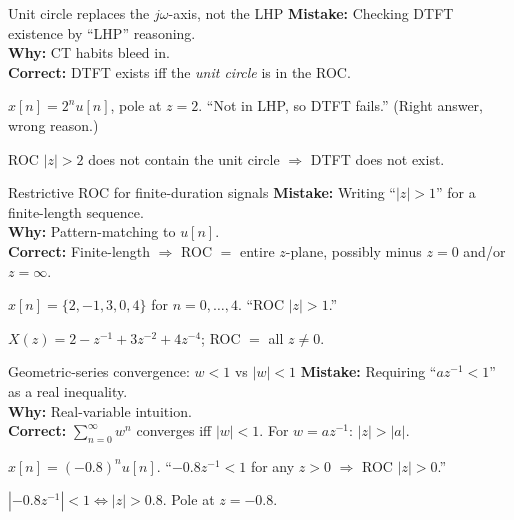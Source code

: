 \documentclass[11pt]{article}
\begin{document}
\begin{pitfallbox}{Unit circle replaces the $j\omega$-axis, not the LHP}
\textbf{Mistake:} Checking DTFT existence by ``LHP'' reasoning.\\
\textbf{Why:} CT habits bleed in.\\
\textbf{Correct:} DTFT exists iff the \emph{unit circle} is in the ROC.
\begin{wrongbox}
$x[n] = 2^n u[n]$, pole at $z=2$. ``Not in LHP, so DTFT fails.'' (Right answer, wrong reason.)
\end{wrongbox}
\begin{rightbox}
ROC $|z|>2$ does not contain the unit circle $\Rightarrow$ DTFT does not exist.
\end{rightbox}
\end{pitfallbox}

\begin{pitfallbox}{Restrictive ROC for finite-duration signals}
\textbf{Mistake:} Writing ``$|z|>1$'' for a finite-length sequence.\\
\textbf{Why:} Pattern-matching to $u[n]$.\\
\textbf{Correct:} Finite-length $\Rightarrow$ ROC $=$ entire $z$-plane, possibly minus $z=0$ and/or $z=\infty$.
\begin{wrongbox}
$x[n] = \{2, -1, 3, 0, 4\}$ for $n=0,\ldots,4$. ``ROC $|z|>1$.''
\end{wrongbox}
\begin{rightbox}
$X(z) = 2 - z^{-1} + 3 z^{-2} + 4 z^{-4}$; ROC $=$ all $z\ne 0$.
\end{rightbox}
\end{pitfallbox}

\begin{pitfallbox}{Geometric-series convergence: $w<1$ vs $|w|<1$}
\textbf{Mistake:} Requiring ``$az^{-1} < 1$'' as a real inequality.\\
\textbf{Why:} Real-variable intuition.\\
\textbf{Correct:} $\sum_{n=0}^\infty w^n$ converges iff $|w|<1$. For $w = az^{-1}$: $|z|>|a|$.
\begin{wrongbox}
$x[n] = (-0.8)^n u[n]$. ``$-0.8 z^{-1} < 1$ for any $z>0$ $\Rightarrow$ ROC $|z|>0$.''
\end{wrongbox}
\begin{rightbox}
$|-0.8 z^{-1}| < 1 \Leftrightarrow |z|>0.8$. Pole at $z=-0.8$.
\end{rightbox}
\end{pitfallbox}

\end{document}
